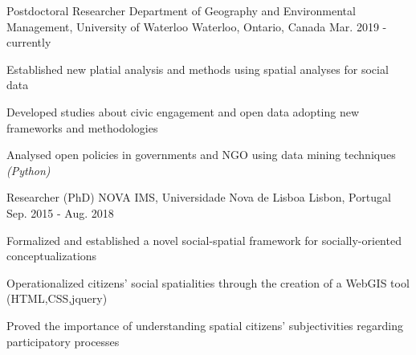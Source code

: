 

\begin{cventries}


  \cventry
    {Postdoctoral Researcher} %
    {Department of Geography and Environmental Management, University of Waterloo} %
    {Waterloo, Ontario, Canada} %
    {Mar. 2019 - currently} %
    {
      \begin{cvitems} %
        \item {Established new platial analysis and methods using spatial analyses for social data}
        \item {Developed studies about civic engagement and open data adopting new frameworks and methodologies}
        \item {Analysed open policies in governments and NGO using data mining techniques \textit{(Python)}}
      \end{cvitems}
    }

  \cventry
    {Researcher (PhD)} %
    {NOVA IMS, Universidade Nova de Lisboa} %
    {Lisbon, Portugal} %
    {Sep. 2015 - Aug. 2018} %
    {
      \begin{cvitems} %
        \item {Formalized and established a novel social-spatial framework for socially-oriented conceptualizations}
        \item {Operationalized citizens' social spatialities through the creation of a WebGIS tool (HTML,CSS,jquery)}
        \item {Proved the importance of understanding spatial citizens' subjectivities regarding participatory processes}
      \end{cvitems}
    }



\end{cventries}

